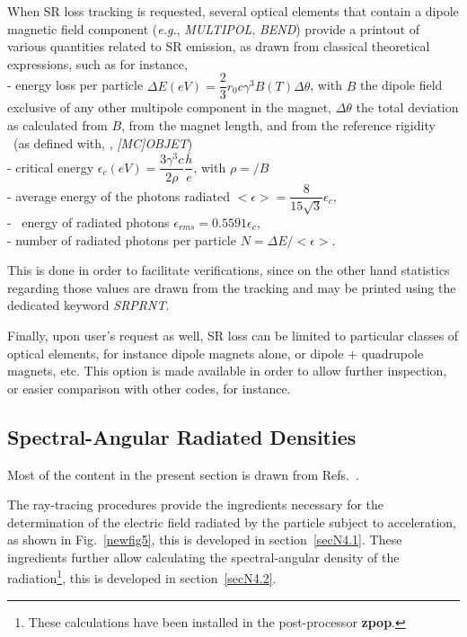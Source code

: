 \bigskip


\noindent When SR loss tracking is requested, several optical elements that contain a dipole 
magnetic field component (\emph{e.g.}, \textsl{MULTIPOL}, \textsl{BEND}) provide a printout of various 
 quantities related to SR emission, as drawn from classical theoretical 
expressions, such as for instance, \\
- energy loss per particle $\Delta E(eV)= \dfrac{2}{3}r_0 c \gamma^3 B(T) \Delta \theta$,   with $B$ 
the dipole field  exclusive of any other multipole component 
in the magnet, $\Delta \theta$  the total deviation as calculated from $B$, from the 
magnet length, and from the reference rigidity \BORO\ (as defined with, \eg, \textsl{[MC]OBJET}) \\
-  critical energy $\epsilon_c(eV)=\dfrac{3 \gamma^3 c}{2 \rho} \dfrac{\bar{h}}{e}$, with 
$\rho =$\BORO$/B$ \\
- average energy of the photons radiated $<\epsilon> = \dfrac{8}{15 \sqrt{3}} \epsilon_c$, \\ 
- \rms\ energy of radiated photons $\epsilon_{rms} = 0.5591 \epsilon_c$, \\
- number of radiated photons per particle  $N = \Delta E /<\epsilon>$.  

\noindent This is done in order to facilitate verifications, since on the other hand statistics 
regarding those values are drawn from the tracking and may be printed using  the dedicated 
keyword \textsl{SRPRNT}. 



\bigskip

\noindent Finally, upon user's request as well,  SR loss can be limited to particular classes of optical 
elements, for instance dipole magnets alone, or dipole + quadrupole magnets, etc. This option 
is made available in order to allow further inspection, or easier comparison with other codes, for instance. 



\subsection{Spectral-Angular Radiated Densities}\label{secSRSpec}

Most of the content in the present section is drawn from Refs.~\protect\cite{FMSL/94-22,FMLPYellow,PALowFreq}.

\medskip

\noindent The ray-tracing procedures provide the ingredients necessary 
for the determination of the electric field radiated by the particle subject to
acceleration, as shown in Fig.~\ref{newfig5}, this is developed in section~\ref{secN4.1}. 
These ingredients further allow calculating the spectral-angular density of the 
radiation\footnote{These calculations have been installed in the 
post-processor  \textbf{zpop}. },   this is developed in section~\ref{secN4.2}. 


